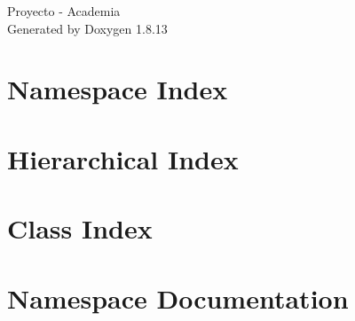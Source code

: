 \documentclass[twoside]{book}
\newcommand{\+}{\discretionary{\mbox{\scriptsize$\hookleftarrow$}}{}{}}
\newcommand{\clearemptydoublepage}{%
  \newpage{\pagestyle{empty}\cleardoublepage}%
}
\begin{document}
\hypersetup{pageanchor=false,
             bookmarksnumbered=true,
             pdfencoding=unicode
            }
\begin{titlepage}
\vspace*{7cm}
\begin{center}%
{\Large Proyecto -\/ Academia }\\
\vspace*{1cm}
{\large Generated by Doxygen 1.8.13}\\
\end{center}
\end{titlepage}
\clearemptydoublepage
{}
\tableofcontents
\clearemptydoublepage
{}
\hypersetup{pageanchor=true}

\chapter{Namespace Index}

\chapter{Hierarchical Index}

\chapter{Class Index}

\chapter{Namespace Documentation}












\end{document}

